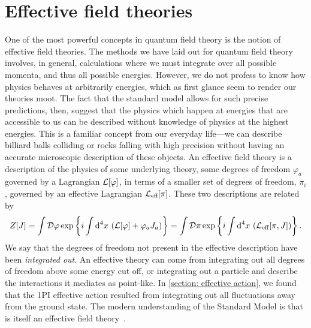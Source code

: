 \section{Effective field theories}


One of the most powerful concepts in quantum field theory is the notion of effective field theories.
The methods we have laid out for quantum field theory involves, in general, calculations where we must integrate over all possible momenta, and thus all possible energies.
However, we do not profess to know how physics behaves at arbitrarily energies, which as first glance seem to render our theories moot.
The fact that the standard model allows for such precise predictions, then, suggest that the physics which happen at energies that are accessible to us can be described without knowledge of physics at the highest energies.
This is a familiar concept from our everyday life---we can describe billiard balls colliding or rocks falling with high precision without having an accurate microscopic description of these objects.
An effective field theory is a description of the physics of some underlying theory, some degrees of freedom $\varphi_a$ governed by a Lagrangian $\mathcal{L}[\varphi]$, in terms of a smaller set of degrees of freedom, $\pi_i$, governed by an effective Lagrangian $\mathcal{L}_\text{eff}[\pi]$.
These two descriptions are related by 
%
\begin{equation}
    Z[J] = \int \mathcal D \varphi \, \text{exp} \left\{ i\int \text{d}^4 x \, \left( \mathcal{L}[\varphi] + \varphi_a J_a \right) \right\}
    = \int \mathcal D \pi\, \text{exp} \left\{ i\int \text{d}^4 x \, \left( \mathcal{L}_\text{eff}[\pi, J]\right) \right\}.
\end{equation}
%
We say that the degrees of freedom not present in the effective description have been \emph{integrated out}.
An effective theory can come from integrating out all degrees of freedom above some energy cut off, or integrating out a particle and describe the interactions it mediates as point-like.
In \autoref{section: effective action}, we found that the 1PI effective action resulted from integrating out all fluctuations away from the ground state.
The modern understanding of the Standard Model is that is itself an effective field theory~\autocite{pencoIntroductionEffectiveField2020}.

